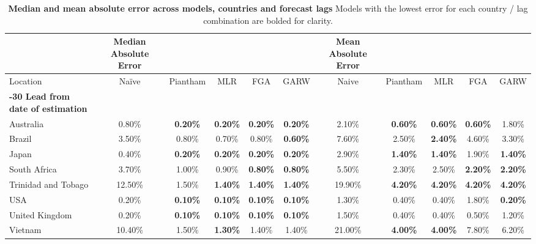 \begin{table}[!ht]
    \centering
	\caption{
		\textbf{Median and mean absolute error across models, countries and forecast lags}
		Models with the lowest error for each country / lag combination are bolded for clarity.
		}
		\label{table:Table1}
    \begin{adjustbox}{max width=\textwidth} %
    \begin{tabular}{|l|c|c|c|c|c|c|c|c|c|c|}
    \hline
        ~ &  \textbf{Median Absolute Error} & ~ & ~ & ~ & ~ & \textbf{Mean Absolute Error} & ~ & ~ & ~ \\ \hline
        Location & Naïve & Piantham & MLR & FGA & GARW & Naive & Piantham & MLR & FGA & GARW \\ \hline
        \textbf{-30 Lead from date of estimation} & ~ & ~ & ~ & ~ & ~ & ~ & ~ & ~ & ~ & ~ \\ \hline
		Australia & 0.80\% & \textbf{0.20\%} & \textbf{0.20\%} & \textbf{0.20\%} & \textbf{0.20\%} & 2.10\% & \textbf{0.60\%} & \textbf{0.60\%} & \textbf{0.60\%} & 1.80\% \\ \hline
        Brazil    & 3.50\% & 0.80\% & 0.70\% & 0.80\% & \textbf{0.60\%} & 7.60\% & 2.50\% & \textbf{2.40\%} & 4.60\% & 3.30\% \\ \hline
        Japan     & 0.40\% & \textbf{0.20\%} & \textbf{0.20\%} & \textbf{0.20\%} & \textbf{0.20\%} & 2.90\% & \textbf{1.40\%} & \textbf{1.40\%} & 1.90\% & \textbf{1.40\%} \\ \hline
        South Africa & 3.70\% & 1.00\% & 0.90\% & \textbf{0.80\%} & \textbf{0.80\%} & 5.50\% & 2.30\% & 2.50\% & \textbf{2.20\%} & \textbf{2.20\%} \\ \hline
        Trinidad and Tobago & 12.50\% & 1.50\% & \textbf{1.40\%} & \textbf{1.40\%} & \textbf{1.40\%} & 19.90\% & \textbf{4.20\%} & \textbf{4.20\%} & \textbf{4.20\%} & \textbf{4.20\%} \\ \hline
        USA & 0.20\% & \textbf{0.10\%} & \textbf{0.10\%} & \textbf{0.10\%} & \textbf{0.10\%} & 1.30\% & 0.40\% & 0.40\% & 1.80\% & \textbf{0.20\%} \\ \hline
        United Kingdom & 0.20\% & \textbf{0.10\%} & \textbf{0.10\%} & \textbf{0.10\%} & \textbf{0.10\%} & 1.50\% & 0.40\% & 0.40\% & 0.50\% & 1.20\% \\ \hline
        Vietnam & 10.40\% & 1.50\% & \textbf{1.30\%} & 1.40\% & 1.40\% & 21.00\% & \textbf{4.00\%} & \textbf{4.00\%} & 7.80\% & 6.20\% \\ \hline

\end{tabular}
\end{adjustbox}
\end{table}
